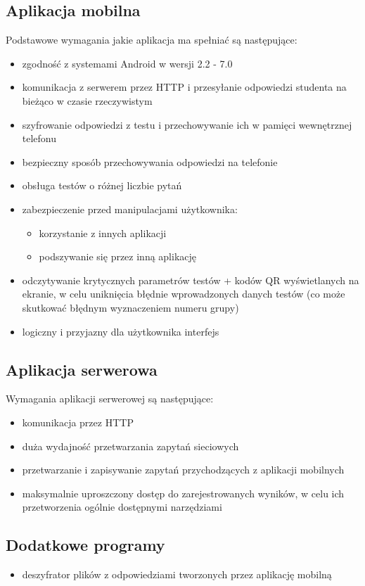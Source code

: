 \documentclass[archivemod, eng]{mgr}
\begin{document}
			\subsection{Aplikacja mobilna}
			Podstawowe wymagania jakie aplikacja ma spełniać są następujące:
			\begin{itemize}
				\item zgodność z systemami Android w wersji 2.2 - 7.0
				\item komunikacja z serwerem przez HTTP i przesyłanie odpowiedzi studenta na bieżąco w czasie rzeczywistym
				\item szyfrowanie odpowiedzi z testu i przechowywanie ich w pamięci wewnętrznej telefonu
				\item bezpieczny sposób przechowywania odpowiedzi na telefonie
				\item obsługa testów o różnej liczbie pytań
				\item zabezpieczenie przed manipulacjami użytkownika:
				\begin{itemize}
					\item korzystanie z innych aplikacji
					\item podszywanie się przez inną aplikację
				\end{itemize} 
				\item odczytywanie krytycznych parametrów testów + kodów QR wyświetlanych na ekranie, w celu uniknięcia błędnie wprowadzonych danych testów (co może skutkować błędnym wyznaczeniem numeru grupy)
				\item logiczny i przyjazny dla użytkownika interfejs
			\end{itemize}
		
			\subsection{Aplikacja serwerowa}
			Wymagania aplikacji serwerowej są następujące:
			\begin{itemize}
				\item komunikacja przez HTTP
				\item duża wydajność przetwarzania zapytań sieciowych
				\item przetwarzanie i zapisywanie zapytań przychodzących z aplikacji mobilnych
				\item maksymalnie uproszczony dostęp do zarejestrowanych wyników, w celu ich przetworzenia ogólnie dostępnymi narzędziami
			\end{itemize}
		
			\subsection{Dodatkowe programy}
			\begin{itemize}
				\item deszyfrator plików z odpowiedziami tworzonych przez aplikację mobilną
			\end{itemize}
		
\end{document}
